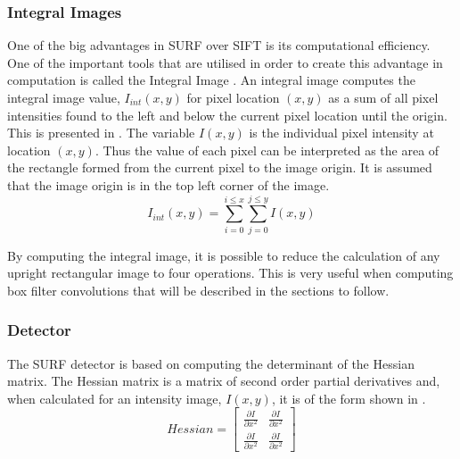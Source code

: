 \documentclass{article}
\begin{document}
\subsubsection{Integral Images}
\label{sec:integralImages}
One of the big advantages in SURF over SIFT \cite{Lowe2004} is its computational efficiency. One of the important tools that are utilised in order to create this advantage in computation is called the Integral Image \cite{Bay2008}. An integral image computes the integral image value, $I_{int}(x,y)$ for pixel location $(x,y)$  as a sum of all pixel intensities found to the left and below the current pixel location until the origin. This is presented in . The variable $I(x,y)$ is the individual pixel intensity at location $(x,y)$. Thus the value of each pixel can be interpreted as the area of the rectangle formed from the current pixel to the image origin. It is assumed that the image origin is in the top left corner of the image. \\

\begin{equation}
I_{int}(x,y) = \sum_{i=0}^{i \leq x}\sum_{j=0}^{j \leq y}I(x,y)
\label{eqn:integralImage}
\end{equation}

By computing the integral image, it is possible to reduce the calculation of any upright rectangular image to four operations. This is very useful when computing box filter convolutions that will be described in the sections to follow.\\

\subsubsection{Detector}
\label{2dsurfdetect}
The SURF detector is based on computing the determinant of the Hessian matrix. The Hessian matrix is a matrix of second order partial derivatives and, when calculated for an intensity image,  $I(x,y)$, it is of the form shown in .\\

\begin{equation}
Hessian = \left[ \begin{array}{cc} \frac{\partial I}{\partial x^2} & \frac{\partial I}{\partial x^2}\\
					    \frac{\partial I}{\partial x^2} & \frac{\partial I}{\partial x^2}\end{array} \right]
\label{eqn:hessian}
\end{equation}
\end{document}
